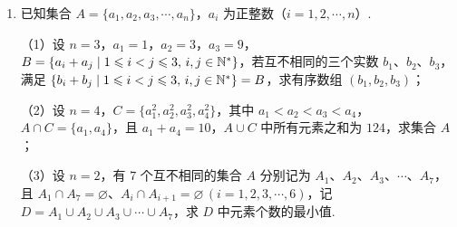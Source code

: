 \documentclass[a4paper,11pt]{article}
\begin{document}
\begin{enumerate}
\ifanswer
\solbegin
{}
\solend
\fi

\ansspace

\item 已知集合 $A=\{a_1,a_2,a_3,\cdots,a_n\}$，$a_i$ 为正整数（$i=1,2,\cdots,n$）.

（1）设 $n=3$，$a_1=1$，$a_2=3$，$a_3=9$，$B=\{a_i+a_j\mid1\leqslant i<j\leqslant3,\,i,j\in\mathbb{N}^*\}$，若互不相同的三个实数 $b_1$、$b_2$、$b_3$，满足 $\{b_i+b_j\mid1\leqslant i<j\leqslant3,\,i,j\in\mathbb{N}^*\}=B$，求有序数组 $(b_1,b_2,b_3)$；

（2）设 $n=4$，$C=\{a_1^2,a_2^2,a_3^2,a_4^2\}$，其中 $a_1<a_2<a_3<a_4$，$A\cap C=\{a_1,a_4\}$，且 $a_1+a_4=10$，$A\cup C$ 中所有元素之和为 $124$，求集合 $A$；

（3）设 $n=2$，有 $7$ 个互不相同的集合 $A$ 分别记为 $A_1$、$A_2$、$A_3$、$\cdots$、$A_7$，且 $A_1\cap A_7=\varnothing$、$A_i\cap A_{i+1}=\varnothing\,(i=1,2,3,\cdots,6)$，记 $D=A_1\cup A_2\cup A_3\cup\cdots\cup A_7$，求 $D$ 中元素个数的最小值.


\end{enumerate}
\end{document}
